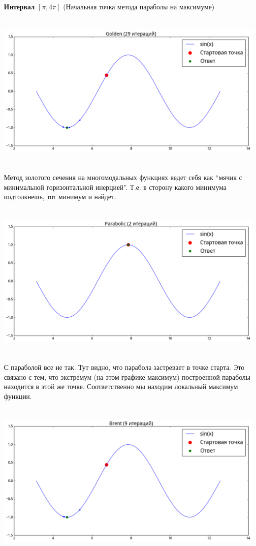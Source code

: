 \documentclass[12pt, a4paper]{article}
\begin{document}
        \def \picwidth {17cm}
        \def \picheight {7.8cm}

        \textbf{Интервал $[\pi, 4\pi]$} (Начальная точка метода параболы на максимуме)

        \begin{center}\includegraphics[width=\picwidth, height=\picheight]{pics/sin_golden_4p.png}\end{center}

        Метод золотого сечения на многомодальных функциях ведет себя как ``мячик с минимальной горизонтальной инерцией''. Т.е. в сторону какого минимума подтолкнешь, тот минимум и найдет.

        \begin{center}\includegraphics[width=\picwidth, height=\picheight]{pics/sin_parabolic_4p.png}\end{center}

        С параболой все не так. Тут видно, что парабола застревает в точке старта. Это связано с тем, что экстремум (на этом графике максимум) построенной параболы находится в этой же точке. Соответственно мы находим локальный максимум функции.

        \begin{center}\includegraphics[width=\picwidth, height=\picheight]{pics/sin_brent_4p.png}\end{center}
\end{document}
